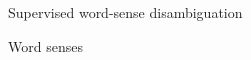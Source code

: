 \documentclass[10pt, compress]{beamer}
\begin{document}
\begin{frame}
\begin{center}
\begin{onlyenv}
\end{onlyenv}




\end{center}
% 


\end{frame}

\begin{frame}[standout]
 
Supervised word-sense disambiguation
 
\end{frame}

\begin{frame}{Word senses}

%
  
\end{frame}










\end{document}
